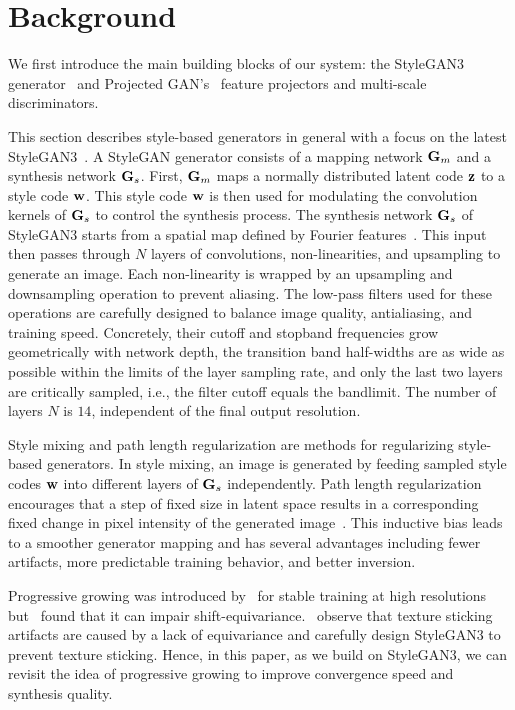\section{Background}
\label{sec:background}
We first introduce the main building blocks of our system:
the StyleGAN3 generator~\cite{Karras2021NEURIPS} and Projected GAN's~\cite{Sauer2021NEURIPS} feature projectors and multi-scale discriminators.

This section describes style-based generators in general with a focus on the latest StyleGAN3~\cite{Karras2021NEURIPS}. A StyleGAN generator consists of a mapping network $\mathbf{G}_m$ and a synthesis network $\mathbf{G}_s$. First, $\mathbf{G}_m$ maps a normally distributed latent code $\mathbf{z}$ to a style code $\mathbf{w}$. This style code $\mathbf{w}$ is then used for modulating the convolution kernels of $\mathbf{G}_s$ to control the synthesis process.
The synthesis network $\mathbf{G}_s$ of StyleGAN3 starts from a spatial map defined by Fourier features~\cite{Tancik2020NEURIPS, Xu2021CVPR}. This input then passes through $N$ layers of convolutions, non-linearities, and upsampling to generate an image. 
Each non-linearity is wrapped by an upsampling and downsampling operation to prevent aliasing. 
The low-pass filters used for these operations are carefully designed to
balance image quality, antialiasing, and training speed.
Concretely, their cutoff and stopband frequencies grow geometrically with network depth, the transition band half-widths are as wide as possible within the limits of the layer sampling rate, and only the last two layers are critically sampled, i.e., the filter cutoff equals the bandlimit. The number of layers $N$ is $14$, independent of the final output resolution.

Style mixing and path length regularization are methods for regularizing style-based generators. In style mixing, an image is generated by feeding sampled style codes $\mathbf{w}$ into different layers of $\mathbf{G}_s$ independently. Path length regularization encourages that a step of fixed size in latent space results in a corresponding fixed change in pixel intensity of the generated image~\cite{Karras2020CVPR}.
This inductive bias leads to a smoother generator mapping and has several advantages including fewer artifacts, more predictable training behavior, and better inversion.

Progressive growing was introduced by~\cite{Karras2018ICLR} for stable training at high resolutions but~\cite{Karras2020CVPR} found that it can impair shift-equivariance.~\cite{Karras2021NEURIPS} observe that texture sticking artifacts are caused by a lack of equivariance and carefully design StyleGAN3 to prevent texture sticking. Hence, in this paper, as we build on StyleGAN3, we can revisit the idea of progressive growing to improve convergence speed and synthesis quality.

